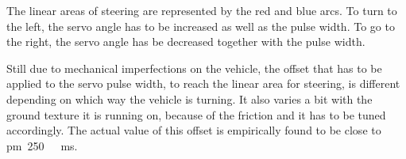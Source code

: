 The linear areas of steering are represented by the red and blue arcs. To turn to the left, the servo angle has to be increased as well as the pulse width. To go to the right, the servo angle has be decreased together with the pulse width.

Still due to mechanical imperfections on the vehicle, the offset that has to be applied to the servo pulse width, to reach the linear area for steering, is different depending on which way the vehicle is turning. It also varies a bit with the ground texture it is running on, because of the friction and it has to be tuned accordingly.
The actual value of this offset is empirically found to be close to \si{\pm 250\ ms}.\\
%
